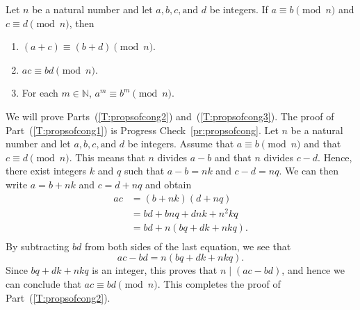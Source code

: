 \begin{theorem} \label{T:propsofcong}
Let  $n$  be a natural number and let  $a, b, c, \text{and }  d$  be integers.  If 
$a \equiv b \pmod n$ and $c \equiv d \pmod n$, then
\begin{enumerate}
  \item $\left( {a + c} \right) \equiv \left( {b + d} \right) \pmod n$.
\label{T:propsofcong1}%
  \item $ac \equiv bd \pmod n$.
\label{T:propsofcong2}%
  \item For each $m \in \mathbb{N}$, $a^m  \equiv b^m \pmod n$.
\label{T:propsofcong3}%
\end{enumerate}
\end{theorem}
%
\begin{myproof}
We will prove Parts~(\ref{T:propsofcong2}) and~(\ref{T:propsofcong3}).  The proof of 
Part~(\ref{T:propsofcong1}) is Progress Check~\ref{pr:propsofcong}.  
Let $n$ be a natural number and let $a, b, c, \text{and }  d$  be integers.  Assume that $a \equiv b \pmod n$ and that $c \equiv d \pmod n$.  This means that  $n$ divides $a-b$ and that $n$ divides $c-d$.  Hence, there exist integers $k$ and $q$ such that $a-b=nk$ and  $c-d=nq$. We can then write  $a = b + nk$  and  $c = d + nq$  and obtain
\[
\begin{aligned}
  ac &= \left( {b + nk} \right)\left( {d + nq} \right) \\ 
     &= bd + bnq + dnk + n^2 kq \\ 
     &= bd + n\left( {bq + dk + nkq} \right). \\ 
\end{aligned} 
\]
By subtracting  $bd$ from both sides of the last equation, we see that
\[
ac - bd = n\left( {bq + dk + nkq} \right).
\]
Since $bq + dk + nkq$ is an integer, this proves that  
$n \mid \left( {ac - bd} \right)$, and hence we can conclude that $ac \equiv bd \pmod n$.  This completes the proof of  Part~(\ref{T:propsofcong2}).    


\end{myproof}
